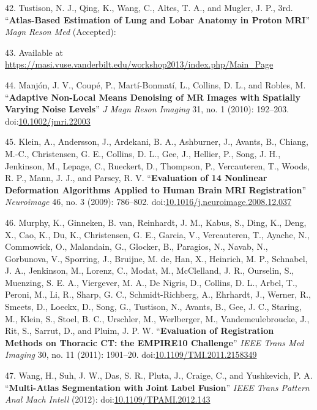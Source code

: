 \documentclass[11pt,]{article}
\begin{document}
42. Tustison, N. J., Qing, K., Wang, C., Altes, T. A., and Mugler, J.
P., 3rd. ``\textbf{Atlas-Based Estimation of Lung and Lobar Anatomy in
Proton MRI}'' \emph{Magn Reson Med} (Accepted):

43. Available at
\url{https://masi.vuse.vanderbilt.edu/workshop2013/index.php/Main_Page}

44. Manj{ó}n, J. V., Coup{é}, P., Mart{í}-Bonmat{í}, L., Collins, D. L.,
and Robles, M. ``\textbf{Adaptive Non-Local Means Denoising of MR Images
with Spatially Varying Noise Levels}'' \emph{J Magn Reson Imaging} 31,
no. 1 (2010): 192--203.
doi:\href{http://dx.doi.org/10.1002/jmri.22003}{10.1002/jmri.22003}

45. Klein, A., Andersson, J., Ardekani, B. A., Ashburner, J., Avants,
B., Chiang, M.-C., Christensen, G. E., Collins, D. L., Gee, J., Hellier,
P., Song, J. H., Jenkinson, M., Lepage, C., Rueckert, D., Thompson, P.,
Vercauteren, T., Woods, R. P., Mann, J. J., and Parsey, R. V.
``\textbf{Evaluation of 14 Nonlinear Deformation Algorithms Applied to
Human Brain MRI Registration}'' \emph{Neuroimage} 46, no. 3 (2009):
786--802.
doi:\href{http://dx.doi.org/10.1016/j.neuroimage.2008.12.037}{10.1016/j.neuroimage.2008.12.037}

46. Murphy, K., Ginneken, B. van, Reinhardt, J. M., Kabus, S., Ding, K.,
Deng, X., Cao, K., Du, K., Christensen, G. E., Garcia, V., Vercauteren,
T., Ayache, N., Commowick, O., Malandain, G., Glocker, B., Paragios, N.,
Navab, N., Gorbunova, V., Sporring, J., Bruijne, M. de, Han, X.,
Heinrich, M. P., Schnabel, J. A., Jenkinson, M., Lorenz, C., Modat, M.,
McClelland, J. R., Ourselin, S., Muenzing, S. E. A., Viergever, M. A.,
De Nigris, D., Collins, D. L., Arbel, T., Peroni, M., Li, R., Sharp, G.
C., Schmidt-Richberg, A., Ehrhardt, J., Werner, R., Smeets, D., Loeckx,
D., Song, G., Tustison, N., Avants, B., Gee, J. C., Staring, M., Klein,
S., Stoel, B. C., Urschler, M., Werlberger, M., Vandemeulebroucke, J.,
Rit, S., Sarrut, D., and Pluim, J. P. W. ``\textbf{Evaluation of
Registration Methods on Thoracic CT: the EMPIRE10 Challenge}''
\emph{IEEE Trans Med Imaging} 30, no. 11 (2011): 1901--20.
doi:\href{http://dx.doi.org/10.1109/TMI.2011.2158349}{10.1109/TMI.2011.2158349}

47. Wang, H., Suh, J. W., Das, S. R., Pluta, J., Craige, C., and
Yushkevich, P. A. ``\textbf{Multi-Atlas Segmentation with Joint Label
Fusion}'' \emph{IEEE Trans Pattern Anal Mach Intell} (2012):
doi:\href{http://dx.doi.org/10.1109/TPAMI.2012.143}{10.1109/TPAMI.2012.143}
\end{document}
